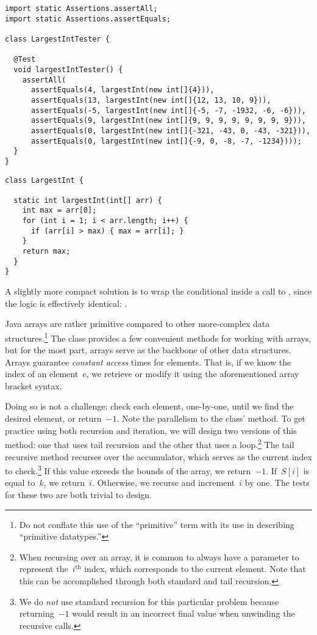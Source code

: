 \begin{lstlisting}[language=MyJava]
import static Assertions.assertAll;
import static Assertions.assertEquals;

class LargestIntTester {

  @Test
  void largestIntTester() {
    assertAll(
      assertEquals(4, largestInt(new int[]{4})), 
      assertEquals(13, largestInt(new int[]{12, 13, 10, 9})), 
      assertEquals(-5, largestInt(new int[]{-5, -7, -1932, -6, -6})), 
      assertEquals(9, largestInt(new int[]{9, 9, 9, 9, 9, 9, 9, 9})), 
      assertEquals(0, largestInt(new int[]{-321, -43, 0, -43, -321})), 
      assertEquals(0, largestInt(new int[]{-9, 0, -8, -7, -1234})));
  }
}
\end{lstlisting}

\begin{lstlisting}[language=MyJava]
class LargestInt {

  static int largestInt(int[] arr) {
    int max = arr[0];
    for (int i = 1; i < arr.length; i++) {
      if (arr[i] > max) { max = arr[i]; }
    }
    return max;
  }
}
\end{lstlisting}

A slightly more compact solution is to wrap the conditional inside a call to , since the logic is effectively identical: .

Java arrays are rather primitive compared to other more-complex data structures.\footnote{Do not conflate this use of the ``primitive'' term with its use in describing ``primitive datatypes.''} 
The  class provides a few convenient methods for working with arrays, but for the most part, arrays serve as the backbone of other data structures. 
Arrays guarantee \emph{constant access} times for elements. 
That is, if we know the index of an element~$e$, we retrieve or modify it using the aforementioned array bracket syntax. 

Doing so is not a challenge: check each element, one-by-one, until we find the desired element, or return~$-1$. 
Note the parallelism to the  class'  method.
To get practice using both recursion and iteration, we will design two versions of this method: one that uses tail recursion and the other that uses a loop.\footnote{When recursing over an array, it is common to always have a parameter to represent the~$i^\text{th}$ index, which corresponds to the current element. Note that this can be accomplished through both standard and tail recursion.} 
The tail recursive method recurses over the accumulator, which serves as the current index to check.\footnote{We do \emph{not} use standard recursion for this particular problem because returning~$-1$ would result in an incorrect final value when unwinding the recursive calls.} 
If this value exceeds the bounds of the array, we return~$-1$. 
If~$S[i]$ is equal to~$k$, we return~$i$. 
Otherwise, we recurse and increment~$i$ by one. 
The tests for these two are both trivial to design.

